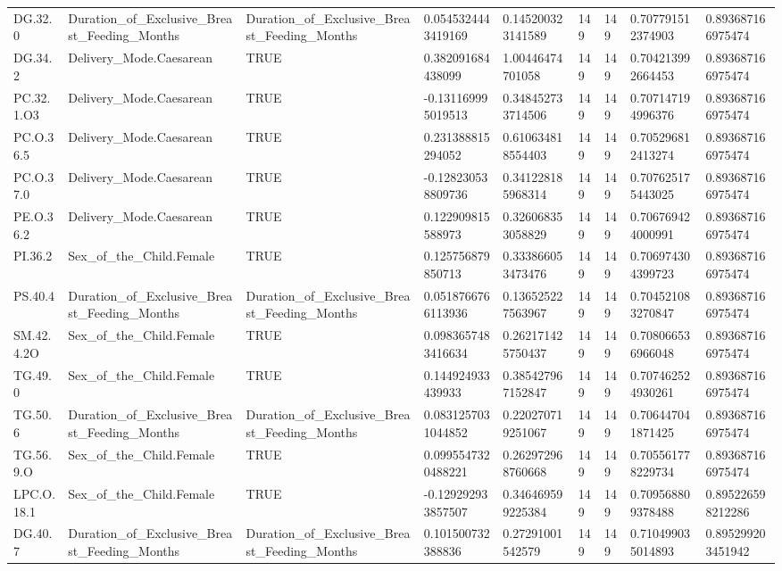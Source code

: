 \begin{longtable}{lllllllll}
DG.32.0 & Duration\_of\_Exclusive\_Breast\_Feeding\_Months & Duration\_of\_Exclusive\_Breast\_Feeding\_Months & 0.0545324443419169 & 0.145200323141589 & 149 & 149 & 0.707791512374903 & 0.893687166975474 \\
DG.34.2 & Delivery\_Mode.Caesarean & TRUE & 0.382091684438099 & 1.00446474701058 & 149 & 149 & 0.704213992664453 & 0.893687166975474 \\
PC.32.1.O3 & Delivery\_Mode.Caesarean & TRUE & -0.131169995019513 & 0.348452733714506 & 149 & 149 & 0.707147194996376 & 0.893687166975474 \\
PC.O.36.5 & Delivery\_Mode.Caesarean & TRUE & 0.231388815294052 & 0.610634818554403 & 149 & 149 & 0.705296812413274 & 0.893687166975474 \\
PC.O.37.0 & Delivery\_Mode.Caesarean & TRUE & -0.128230538809736 & 0.341228185968314 & 149 & 149 & 0.707625175443025 & 0.893687166975474 \\
PE.O.36.2 & Delivery\_Mode.Caesarean & TRUE & 0.122909815588973 & 0.326068353058829 & 149 & 149 & 0.706769424000991 & 0.893687166975474 \\
PI.36.2 & Sex\_of\_the\_Child.Female & TRUE & 0.125756879850713 & 0.333866053473476 & 149 & 149 & 0.706974304399723 & 0.893687166975474 \\
PS.40.4 & Duration\_of\_Exclusive\_Breast\_Feeding\_Months & Duration\_of\_Exclusive\_Breast\_Feeding\_Months & 0.0518766766113936 & 0.136525227563967 & 149 & 149 & 0.704521083270847 & 0.893687166975474 \\
SM.42.4.2O & Sex\_of\_the\_Child.Female & TRUE & 0.0983657483416634 & 0.262171425750437 & 149 & 149 & 0.708066536966048 & 0.893687166975474 \\
TG.49.0 & Sex\_of\_the\_Child.Female & TRUE & 0.144924933439933 & 0.385427967152847 & 149 & 149 & 0.707462524930261 & 0.893687166975474 \\
TG.50.6 & Duration\_of\_Exclusive\_Breast\_Feeding\_Months & Duration\_of\_Exclusive\_Breast\_Feeding\_Months & 0.0831257031044852 & 0.220270719251067 & 149 & 149 & 0.706447041871425 & 0.893687166975474 \\
TG.56.9.O & Sex\_of\_the\_Child.Female & TRUE & 0.0995547320488221 & 0.262972968760668 & 149 & 149 & 0.705561778229734 & 0.893687166975474 \\
LPC.O.18.1 & Sex\_of\_the\_Child.Female & TRUE & -0.129292933857507 & 0.346469599225384 & 149 & 149 & 0.709568809378488 & 0.895226598212286 \\
DG.40.7 & Duration\_of\_Exclusive\_Breast\_Feeding\_Months & Duration\_of\_Exclusive\_Breast\_Feeding\_Months & 0.101500732388836 & 0.27291001542579 & 149 & 149 & 0.710499035014893 & 0.895299203451942 \\

\end{longtable}
